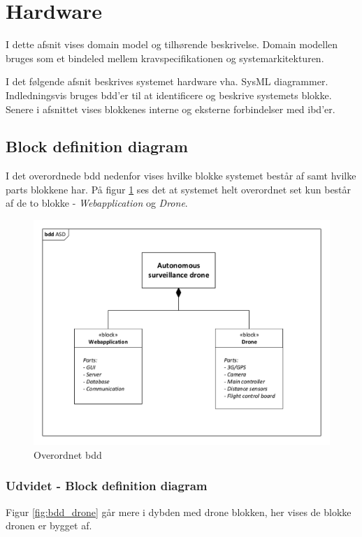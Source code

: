 \section{Hardware}

I dette afsnit vises domain model og tilhørende beskrivelse.
Domain modellen bruges som et bindeled mellem kravspecifikationen og systemarkitekturen.  

I det følgende afsnit beskrives systemet hardware vha. SysML diagrammer. 
Indledningsvis bruges bdd'er til at identificere og beskrive systemets blokke. Senere i afsnittet vises blokkenes interne og eksterne forbindelser med ibd'er.

\subsection{Block definition diagram}
I det overordnede bdd nedenfor vises hvilke blokke systemet består af samt hvilke parts blokkene har. På figur \ref{fig:bdd_overordnet} ses det at systemet helt overordnet set kun består af de to blokke - \textit{Webapplication} og \textit{Drone}. 

\begin{figure}[H]
\centering
\includegraphics[width=1\textwidth]{Billeder/BDD/bdd_overordnet.pdf}
\caption{Overordnet bdd}
\label{fig:bdd_overordnet}
\end{figure}

\newpage
\subsubsection{Udvidet - Block definition diagram}
Figur \ref{fig:bdd_drone} går mere i dybden med drone blokken, her vises de blokke dronen er bygget af.

